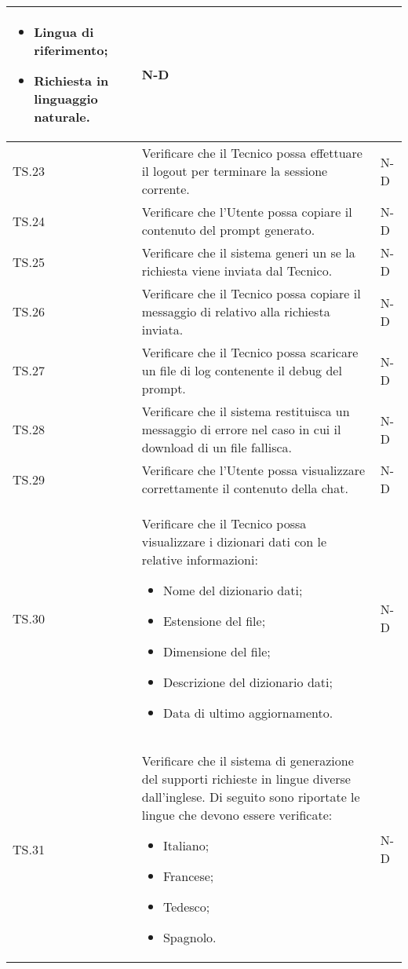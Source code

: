 \begin{adjustwidth}{-0.5cm}{-0.5cm}
\begin{longtable}{|P{1.5cm}|>{\raggedright}P{9.5cm}|>{\arraybackslash}P{1.5cm}|}
\begin{itemize}
			\item Lingua di riferimento;
			\item Richiesta in linguaggio naturale.
		\end{itemize} & N-D \\
		\hline TS.23 & Verificare che il Tecnico possa effettuare il logout per terminare la sessione corrente. & N-D \\ 
		\hline TS.24 & Verificare che l'Utente possa copiare il contenuto del prompt generato. & N-D \\ 
		\hline TS.25 & Verificare che il sistema generi un  se la richiesta viene inviata dal Tecnico. & N-D \\ 
		\hline TS.26 & Verificare che il Tecnico possa copiare il messaggio di  relativo alla richiesta inviata. & N-D \\ 
		\hline TS.27 & Verificare che il Tecnico possa scaricare un file di log contenente il debug del prompt. & N-D \\
		\hline TS.28 & Verificare che il sistema restituisca un messaggio di errore nel caso in cui il download di un file fallisca. & N-D \\  
		\hline TS.29 & Verificare che l'Utente possa visualizzare correttamente il contenuto della chat. & N-D \\  
		\hline TS.30 & Verificare che il Tecnico possa visualizzare i dizionari dati con le relative informazioni:
		\begin{itemize}
			\item Nome del dizionario dati;
			\item Estensione del file;
			\item Dimensione del file;
			\item Descrizione del dizionario dati;
			\item Data di ultimo aggiornamento.
		\end{itemize} & N-D \\  
		\hline TS.31 & Verificare che il sistema di generazione del  supporti richieste in lingue diverse dall'inglese. Di seguito sono riportate le lingue che devono essere verificate: 
		\begin{itemize}
			\item Italiano;
			\item Francese;
			\item Tedesco;
			\item Spagnolo. 
		\end{itemize}
		& N-D \\  
	\end{longtable}
\end{adjustwidth}
\egroup

